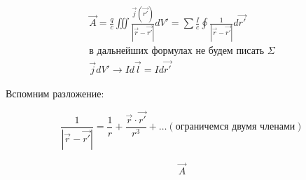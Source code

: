 \begin{gather*}
    \vec{A}=\frac{q}{c} \iiint \frac{\vec{j}(\vec{r'})}{|\vec{r}-\vec{r'}|}dV'=\sum \frac{I}{c}\oint \frac{1}{|\vec{r}-\vec{r'}|}d\vec{r'} \\
    \text{в дальнейших формулах не будем писать }\Sigma \\
    \vec{j}dV'\rightarrow Id\vec{l}=Id\vec{r'} 
\end{gather*}

Вспомним разложение:

\[
\frac{1}{|\vec{r}-\vec{r'}|} =\frac{1}{r}+\frac{\vec{r}\cdot\vec{r'}}{r^3}+\dots (\text{ограничемся двумя членами})
\]

\begin{gather*}
    \vec{A}
\end{gather*}
